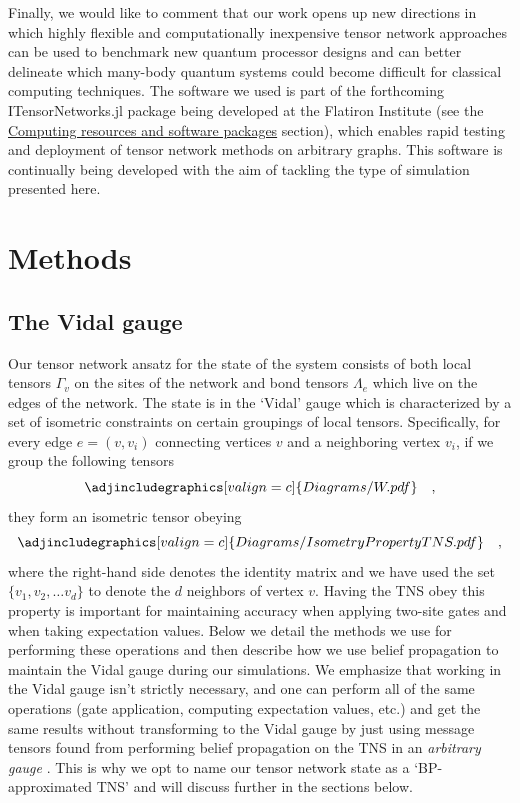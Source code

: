 \documentclass[%
 superscriptaddress,
 amsmath,amssymb,
 prx, nofootinbib,
]{revtex4-2}
\begin{document}
Finally, we would like to comment that our work opens up new directions in which highly flexible and computationally inexpensive tensor network approaches can be used to benchmark new quantum processor designs and can better delineate which many-body quantum systems could become difficult for classical computing techniques. The software we used is part of the forthcoming ITensorNetworks.jl package \cite{ITensorNetworks} being developed at the Flatiron Institute  (see the \hyperref[Subsec:ComputingResources]{Computing resources and software packages} section), which enables rapid testing and deployment of tensor network methods on arbitrary graphs. This software is continually being developed with the aim of tackling the type of simulation presented here.  


\section*{Methods}
\label{Sec:Methods}
\subsection*{The Vidal gauge}
Our tensor network ansatz for the state of the system consists of both local tensors $\Gamma_{v}$ on the sites of the network and bond tensors $\Lambda_{e}$ which live on the edges of the network. The state is in the `Vidal' gauge which is characterized by a set of isometric constraints on certain groupings of local tensors. Specifically, for every edge $e = (v, v_{i})$ connecting vertices $v$ and a neighboring vertex $v_i$, if we group the following tensors
\begin{equation}
    \adjincludegraphics[valign=c]{Diagrams/W.pdf} \quad,
    \label{Eq:IsometryPropertyDefinition}
\end{equation}
they form an isometric tensor obeying
\begin{equation}
    \adjincludegraphics[valign=c]{Diagrams/IsometryPropertyTNS.pdf} \quad ,
    \label{Eq:IsometryDefinition}
\end{equation}
where the right-hand side denotes the identity matrix and we have used the set $\{v_{1}, v_{2}, \hdots v_{d}\}$ to denote the $d$ neighbors of vertex $v$. Having the TNS obey this property is important for maintaining accuracy when applying two-site gates and when taking expectation values. Below we detail the methods we use for performing these operations and then describe how we use belief propagation to maintain the Vidal gauge during our simulations. We emphasize that working in the Vidal gauge isn't strictly necessary, and one can perform all of the same operations (gate application, computing expectation values, etc.) and get the same results without transforming to the Vidal gauge by just using message tensors found from performing belief propagation on the TNS in an \textit{arbitrary gauge} \cite{TindallGauging2023}. This is why we opt to name our tensor network state as a `BP-approximated TNS' and will discuss further in the sections below. 
\end{document}
